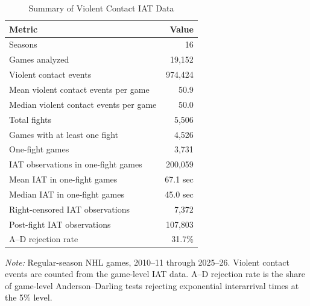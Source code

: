 \begin{table}[htbp]
\centering
\caption{Summary of Violent Contact IAT Data}
\label{tab:iat_summary}
\small
\renewcommand{\arraystretch}{1.15}
\setlength{\tabcolsep}{6pt}

\begin{tabular*}{0.78\textwidth}{@{\extracolsep{\fill}}lr}
\toprule
Metric & Value \\
\midrule
Seasons & 16 \\
Games analyzed & 19,152 \\
Violent contact events & 974,424 \\
Mean violent contact events per game & 50.9 \\
Median violent contact events per game & 50.0 \\
Total fights & 5,506 \\
Games with at least one fight & 4,526 \\
One-fight games & 3,731 \\
IAT observations in one-fight games & 200,059 \\
Mean IAT in one-fight games & 67.1 sec \\
Median IAT in one-fight games & 45.0 sec \\
Right-censored IAT observations & 7,372 \\
Post-fight IAT observations & 107,803 \\
A--D rejection rate & 31.7\% \\
\bottomrule
\end{tabular*}

\vspace{0.4em}
\parbox{0.78\textwidth}{
\footnotesize
\textit{Note:} Regular-season NHL games, 2010--11 through 2025--26. Violent contact events are counted from the game-level IAT data. A--D rejection rate is the share of game-level Anderson--Darling tests rejecting exponential interarrival times at the 5\% level.
}
\end{table}
